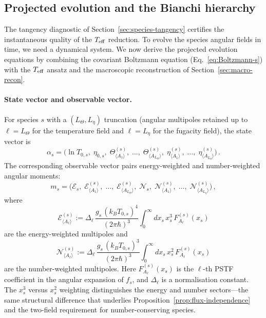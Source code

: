 \subsection{Projected evolution and the Bianchi hierarchy}
\label{sec:projected-evolution}

The tangency diagnostic of
Section~\ref{sec:species-tangency} certifies the
instantaneous quality of the $T_{\mathrm{eff}}$ reduction.  To
evolve the species angular fields in time, we need a
dynamical system.  We now derive the projected evolution
equations by combining the covariant Boltzmann equation
(Eq.~\ref{eq:Boltzmann-s}) with the $T_{\mathrm{eff}}$ ansatz and
the macroscopic reconstruction of
Section~\ref{sec:macro-recon}.


\paragraph{State vector and observable vector.}

For species $s$ with a $(L_\Theta, L_\eta)$ truncation
(angular multipoles retained up to $\ell = L_\Theta$
for the temperature field and $\ell = L_\eta$ for the
fugacity field), the state vector is
\begin{equation}\label{eq:state-vector}
\alpha_s
= \Big(
\ln T_{0,s},\;
\eta_{0,s},\;
\Theta^{(s)}_{\langle A_1 \rangle},\;
\ldots,\;
\Theta^{(s)}_{\langle A_{L_\Theta} \rangle},\;
\eta^{(s)}_{\langle A_1 \rangle},\;
\ldots,\;
\eta^{(s)}_{\langle A_{L_\eta} \rangle}
\Big)\,.
\end{equation}
The corresponding observable vector pairs energy-weighted
and number-weighted angular moments:
\begin{equation}\label{eq:obs-vector}
m_s
= \Big(
\mathcal{E}_s,\;
\mathcal{E}^{(s)}_{\langle A_1 \rangle},\;
\ldots,\;
\mathcal{E}^{(s)}_{\langle A_{L_\Theta} \rangle},\;
\mathcal{N}_s,\;
\mathcal{N}^{(s)}_{\langle A_1 \rangle},\;
\ldots,\;
\mathcal{N}^{(s)}_{\langle A_{L_\eta} \rangle}
\Big)\,,
\end{equation}
where
\begin{equation}\label{eq:energy-moments}
\mathcal{E}^{(s)}_{\langle A_\ell \rangle}
:= \Delta_\ell\,
  \frac{g_s\,(k_B T_{0,s})^4}{(2\pi\hbar)^3}
  \int_0^\infty dx_s\, x_s^3\,
  F^{(s)}_{A_\ell}(x_s)
\end{equation}
are the energy-weighted multipoles and
\begin{equation}\label{eq:number-moments}
\mathcal{N}^{(s)}_{\langle A_\ell \rangle}
:= \Delta_\ell\,
  \frac{g_s\,(k_B T_{0,s})^3}{(2\pi\hbar)^3}
  \int_0^\infty dx_s\, x_s^2\,
  F^{(s)}_{A_\ell}(x_s)
\end{equation}
are the number-weighted multipoles.  Here
$F^{(s)}_{A_\ell}(x_s)$ is the $\ell$-th PSTF
coefficient in the angular expansion of $f_s$, and
$\Delta_\ell$ is a normalisation constant.  The $x_s^3$
versus $x_s^2$ weighting distinguishes the energy and
number sectors---the same structural difference that
underlies
Proposition~\ref{prop:flux-independence} and the
two-field requirement for number-conserving species.


